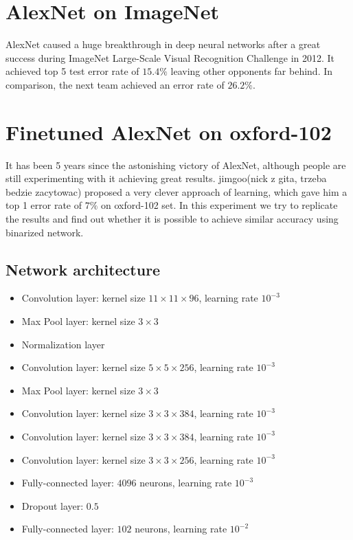 \documentclass[licencjacka]{pracamgr}
\begin{document}
	\section{AlexNet on ImageNet}
	AlexNet caused a huge breakthrough in deep neural networks after a great success during ImageNet Large-Scale Visual Recognition Challenge in 2012. It achieved top 5 test error rate of $15.4\%$ leaving other opponents far behind. In comparison, the next team achieved an error rate of $26.2\%$. 
	\section{Finetuned AlexNet on oxford-102}
	It has been 5 years since the astonishing victory of AlexNet, although people are still experimenting with it achieving great results. jimgoo(nick z gita, trzeba bedzie zacytowac) proposed a very clever approach of learning, which gave him a top 1 error rate of $7\%$ on oxford-102 set. In this experiment we try to replicate the results and find out whether it is possible to achieve similar accuracy using binarized network. 
		\subsection{Network architecture}
			\begin{itemize}
			\item Convolution layer: kernel size $11 \times 11 \times 96$, learning rate $10^{-3}$
			\item Max Pool layer: kernel size $3 \times 3$
			\item Normalization layer
			\item Convolution layer: kernel size $5 \times 5 \times 256$, learning rate $10^{-3}$
			\item Max Pool layer: kernel size $3 \times 3$
			\item Convolution layer: kernel size $3 \times 3 \times 384$, learning rate $10^{-3}$
			\item Convolution layer: kernel size $3 \times 3 \times 384$, learning rate $10^{-3}$
			\item Convolution layer: kernel size $3 \times 3 \times 256$, learning rate $10^{-3}$
			\item Fully-connected layer: $4096$ neurons, learning rate $10^{-3}$
			\item Dropout layer: $0.5$
			\item Fully-connected layer: $102$ neurons, learning rate $10^{-2}$
			\end{itemize}
\end{document}
